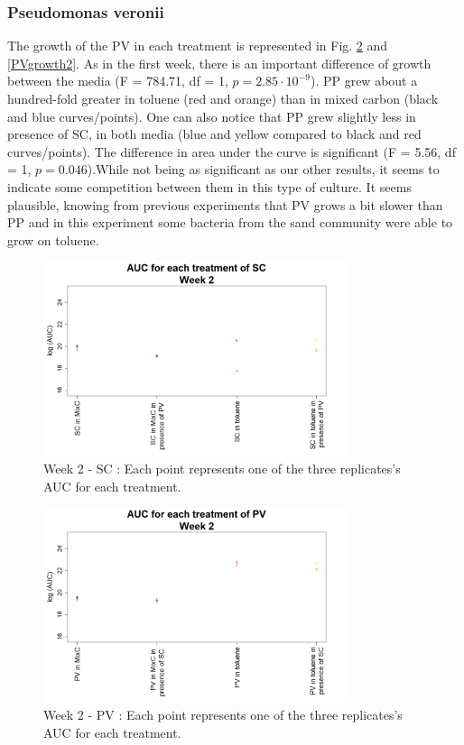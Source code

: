 \documentclass[a4paper, 10pt, conference]{ieeeconf}   %
\begin{document}
\subsubsection{Pseudomonas veronii}
The growth of the PV in each treatment is represented in Fig. \ref{aucpvw2} and \ref{PVgrowth2}.
As in the first week, there is an important difference of growth between the media (F = 784.71, df = 1, $p = 2.85 \cdot 10^{-9}$). PP grew about a hundred-fold greater in toluene (red and orange) than in mixed carbon (black and blue curves/points).
One can also notice that PP grew slightly less in presence of SC, in both media (blue and yellow compared to black and red curves/points). The difference in area under the curve is significant (F = 5.56, df = 1, $p = 0.046$).While not being as significant as our other results, it seems to indicate some competition between them in this type of culture. It seems plausible, knowing from previous experiments that PV grows a bit slower than PP and in this experiment some bacteria from the sand community were able to grow on toluene.
\newline

\begin{figure}[H]
	\centering
	\includegraphics[width=9cm]{AUCsc2.png}
	\caption{Week 2 - SC : Each point represents one of the three replicates's AUC for each treatment.}
	\label{aucscw2}
\end{figure}%
\vspace{-0.3cm}
\begin{figure}[H]
	\centering
	\includegraphics[width=9cm]{AUCpv2.png}
	\caption{Week 2 - PV : Each point represents one of the three replicates's AUC for each treatment.}
	\label{aucpvw2}
\end{figure}
\end{document}
